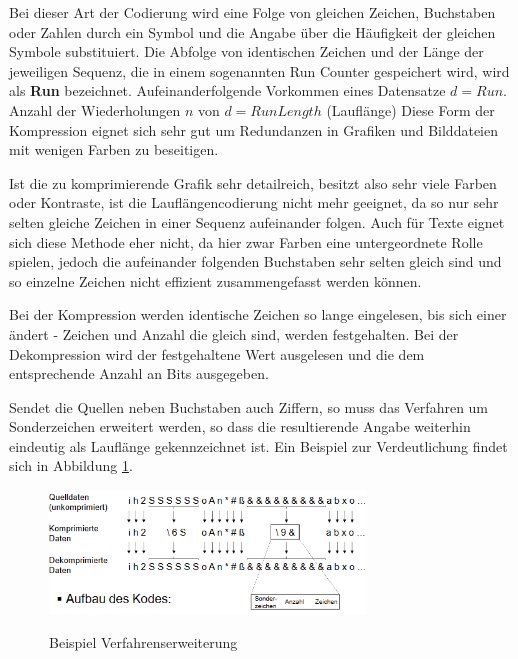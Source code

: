 \documentclass[11pt,a4paper,ngerman]{report}
\begin{document}
  		  
  		  Bei dieser Art der Codierung wird eine Folge von gleichen Zeichen, Buchstaben oder Zahlen durch ein Symbol und die Angabe über die Häufigkeit der gleichen Symbole substituiert. Die Abfolge von identischen Zeichen und der Länge der jeweiligen Sequenz, die in einem sogenannten Run Counter gespeichert wird, wird als \textbf{Run} bezeichnet. Aufeinanderfolgende Vorkommen eines Datensatze $d = Run$. Anzahl der Wiederholungen $n$ von $d = RunLength$ (Lauflänge) Diese Form der Kompression eignet sich sehr gut um Redundanzen in Grafiken und Bilddateien mit wenigen Farben zu beseitigen.
  	  
  		  Ist die zu komprimierende Grafik sehr detailreich, besitzt also sehr viele Farben oder Kontraste, ist die Lauflängencodierung nicht mehr geeignet,  da so nur sehr selten gleiche Zeichen in einer Sequenz aufeinander folgen.\cite{ITWissen.info} Auch für Texte eignet sich diese Methode eher nicht, da hier zwar Farben eine untergeordnete Rolle spielen, jedoch die aufeinander folgenden Buchstaben sehr selten gleich sind und so einzelne Zeichen nicht effizient zusammengefasst werden können.\cite[Seite 61]{Lange2021}
  		  
  		  Bei der Kompression werden identische Zeichen so lange eingelesen, bis sich einer ändert - Zeichen und Anzahl die gleich sind, werden festgehalten. Bei der Dekompression wird der festgehaltene Wert ausgelesen und die dem entsprechende Anzahl an Bits ausgegeben.\cite{ITWissen.info}
  		  
  		  Sendet die Quellen neben Buchstaben auch Ziffern, so muss das Verfahren um Sonderzeichen erweitert werden, so dass die resultierende Angabe weiterhin eindeutig als Lauflänge gekennzeichnet ist. \cite[Seite 62]{Lange2021} Ein Beispiel zur Verdeutlichung findet sich in Abbildung \ref{Lange}.
  		  
  		   \begin{figure} [H]
  		  	\begin{center}
  		  		\includegraphics[width=0.75\textwidth]{alpha_ziffer.png}
  		  		\caption{Beispiel Verfahrenserweiterung}
  		  		\cite[Seite 62]{Lange2021}
  		  		\label{Lange}
  		  	\end{center}
  		  \end{figure}
  		  
\end{document}
